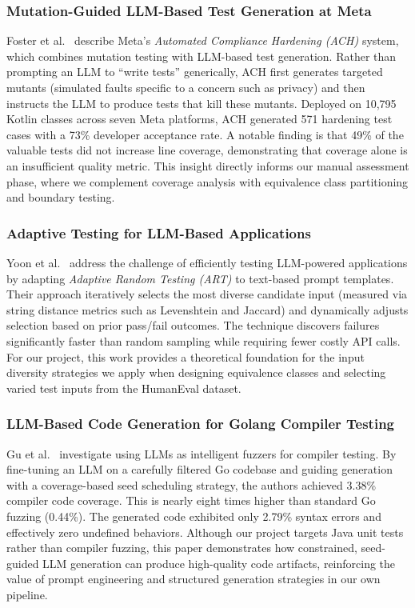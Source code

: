 \documentclass[12pt, a4paper]{article}
\begin{document}
\subsubsection{Mutation-Guided LLM-Based Test Generation at Meta}
Foster et al.~\cite{mutation_meta} describe Meta's \textit{Automated Compliance Hardening (ACH)} system, which combines mutation testing with LLM-based test generation. Rather than prompting an LLM to ``write tests'' generically, ACH first generates targeted mutants (simulated faults specific to a concern such as privacy) and then instructs the LLM to produce tests that kill these mutants. Deployed on 10,795 Kotlin classes across seven Meta platforms, ACH generated 571 hardening test cases with a 73\% developer acceptance rate. A notable finding is that 49\% of the valuable tests did not increase line coverage, demonstrating that coverage alone is an insufficient quality metric. This insight directly informs our manual assessment phase, where we complement coverage analysis with equivalence class partitioning and boundary testing.

\subsubsection{Adaptive Testing for LLM-Based Applications}
Yoon et al.~\cite{adaptive_testing} address the challenge of efficiently testing LLM-powered applications by adapting \textit{Adaptive Random Testing (ART)} to text-based prompt templates. Their approach iteratively selects the most diverse candidate input (measured via string distance metrics such as Levenshtein and Jaccard) and dynamically adjusts selection based on prior pass/fail outcomes. The technique discovers failures significantly faster than random sampling while requiring fewer costly API calls. For our project, this work provides a theoretical foundation for the input diversity strategies we apply when designing equivalence classes and selecting varied test inputs from the HumanEval dataset.

\subsubsection{LLM-Based Code Generation for Golang Compiler Testing}
Gu et al.~\cite{golang_compiler} investigate using LLMs as intelligent fuzzers for compiler testing. By fine-tuning an LLM on a carefully filtered Go codebase and guiding generation with a coverage-based seed scheduling strategy, the authors achieved 3.38\% compiler code coverage. This is nearly eight times higher than standard Go fuzzing (0.44\%). The generated code exhibited only 2.79\% syntax errors and effectively zero undefined behaviors. Although our project targets Java unit tests rather than compiler fuzzing, this paper demonstrates how constrained, seed-guided LLM generation can produce high-quality code artifacts, reinforcing the value of prompt engineering and structured generation strategies in our own pipeline.
\end{document}
